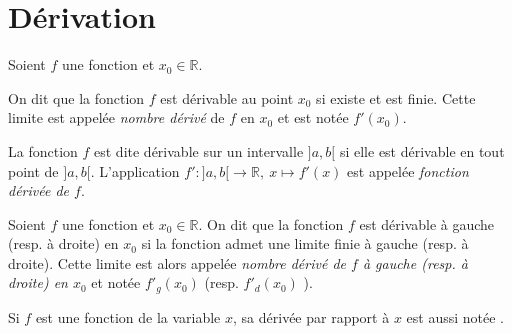\section{D\'erivation}
      \begin{defi}[D\'erivabilit\'e]
            Soient $f$ une fonction et $x_0 \in \mathbb{R}$.
            
            On dit que la fonction $f$ est d\'erivable au point $x_0$ si 
            existe et est finie.
            Cette limite est appel\'ee \emph{nombre d\'eriv\'e} de $f$ en $x_0$ et est not\'ee \emph{$f'(x_0)$}.
            
            La fonction $f$ est dite d\'erivable sur un intervalle $]a,b[$ si elle est d\'erivable en tout point de $]a,b[$.
            L'application $f' : ]a,b[ \rightarrow \mathbb{R} , \ x \mapsto f'(x)$ est appel\'ee 
            \emph{fonction d\'eriv\'ee de $f$}.
            
      \end{defi}
      
      \begin{defi}
            Soient $f$ une fonction et $x_0 \in \mathbb{R}$.
            On dit que la fonction $f$ est d\'erivable \`a gauche (resp. \`a droite) en $x_0$ si la fonction 
            admet une limite finie \`a gauche (resp. \`a droite).
            Cette limite est alors appel\'ee \emph{nombre d\'eriv\'e de $f$ \`a gauche (resp. \`a droite) en $x_0$}
            et not\'ee $f'_g (x_0)$ (resp. $f'_d (x_0)$ ).
            
            Si $f$ est une fonction de la variable $x$, sa d\'eriv\'ee par rapport \`a $x$ est aussi not\'ee 
                  .
            
      \end{defi}
      

